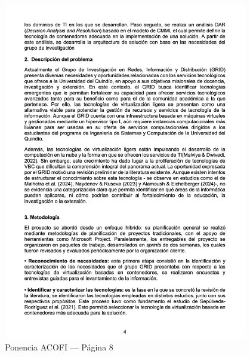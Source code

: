 \begin{figure}[H]
    \centering
    \begin{tcolorbox}[
        colback=white,
        colframe=gray!50,
        boxrule=1pt,
        arc=2pt,
        boxsep=5pt,
        left=3pt,
        right=3pt,
        top=3pt,
        bottom=3pt,
        drop shadow
    ]
        \includegraphics[width=0.95\textwidth,keepaspectratio]{apendices/ACOFI/pagina_8.png}
    \end{tcolorbox}
    \caption{Ponencia ACOFI --- Página 8}\label{fig:acofi-pagina-8}
\end{figure}
\FloatBarrier%
